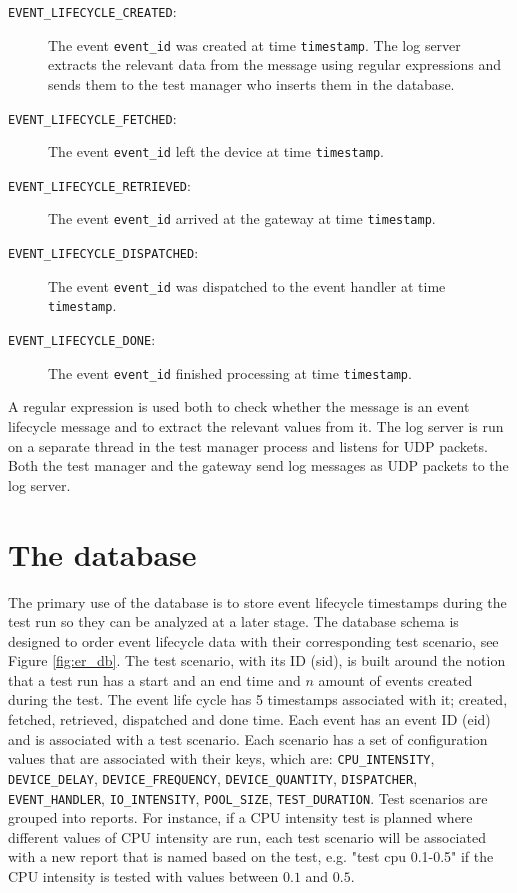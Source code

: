 \begin{description}

    \item[\texttt{EVENT\_LIFECYCLE\_CREATED}:] The event \texttt{event\_id} was
        created at time \texttt{timestamp}. The log server extracts the
        relevant data from the message using regular expressions and sends them
        to the test manager who inserts them in the database.

    \item[\texttt{EVENT\_LIFECYCLE\_FETCHED}:] The event \texttt{event\_id}
        left the device at time \texttt{timestamp}.

    \item[\texttt{EVENT\_LIFECYCLE\_RETRIEVED}:] The event \texttt{event\_id}
        arrived at the gateway at time \texttt{timestamp}.

    \item[\texttt{EVENT\_LIFECYCLE\_DISPATCHED}:] The event \texttt{event\_id}
        was dispatched to the event handler at time \texttt{timestamp}.

    \item[\texttt{EVENT\_LIFECYCLE\_DONE}:] The event \texttt{event\_id}
        finished processing at time \texttt{timestamp}.

\end{description}

A regular expression is used both to check whether the message is an event
lifecycle message and to extract the relevant values from it. The log server is
run on a separate thread in the test manager process and listens for UDP
packets. Both the test manager and the gateway send log messages as UDP packets
to the log server.

\section{The database}

The primary use of the database is to store event lifecycle timestamps during
the test run so they can be analyzed at a later stage. The database schema is
designed to order event lifecycle data with their corresponding test scenario,
see Figure \ref{fig:er_db}. The test scenario, with its ID (sid), is built
around the notion that a test run has a start and an end time and $n$ amount of
events created during the test. The event life cycle has 5 timestamps
associated with it; created, fetched, retrieved, dispatched and done time. Each
event has an event ID (eid) and is associated with a test scenario. Each
scenario has a set of configuration values that are associated with their keys,
which are: \texttt{CPU\_INTENSITY}, \texttt{DEVICE\_DELAY},
\texttt{DEVICE\_FREQUENCY}, \texttt{DEVICE\_QUANTITY}, \texttt{DISPATCHER},
\texttt{EVENT\_HANDLER}, \texttt{IO\_INTENSITY}, \texttt{POOL\_SIZE},
\texttt{TEST\_DURATION}. Test scenarios are grouped into reports. For instance,
if a CPU intensity test is planned where different values of CPU intensity are
run, each test scenario will be associated with a new report that is named
based on the test, e.g. "test cpu 0.1-0.5" if the CPU intensity is tested with
values between $0.1$ and $0.5$.

